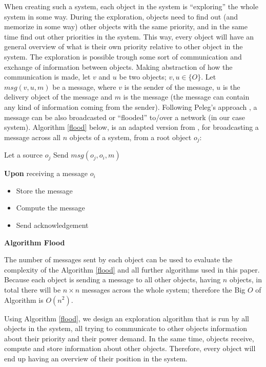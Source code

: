 \documentclass[../main/Self-Stabilization.tex]{subfiles}
\begin{document}
When creating such a system, each object in the system is ``exploring'' the whole system in some way. During the exploration, objects need to find out (and memorize in some way) other objects with the same priority, and in the same time find out other priorities in the system. This way, every object will have an general overview of what is their own priority relative to other object in the system. The exploration is possible trough some sort of communication and exchange of information between objects. Making abstraction of how the communication is made, let $v$ and $u$ be two objects; $v,u \in\{O\}$. Let $msg(v,u,m)$ be a message, where $v$ is the sender of the message, $u$ is the delivery object of the message and $m$ is the message (the message can contain any kind of information coming from the sender). Following Peleg's approach \cite{peleg2000distributed}, a message can be also broadcasted or ``flooded'' to/over a network (in our case system). Algorithm \ref{flood} below, is an adapted version from \cite{peleg2000distributed}, for broadcasting a message across all $n$ objects of a system, from a root object $o_{j}$:

\LinesNumbered
\IncMargin{1em}
\begin{algorithm}
Let a source $o_{j}$
\BlankLine
{} {
     {	
        Send \emph{$msg(o_{j},o_{i},m)$}
    }
}
 {
    \textbf{Upon} receiving a message $o_{i}$
    \begin{itemize}
      \item Store the message
      \item Compute the message
      \item Send acknowledgement
    \end{itemize}
}
\caption{\textbf{Algorithm Flood}} \label{flood}
\end{algorithm}
\DecMargin{1em}

The number of messages sent by each object can be used to evaluate the complexity of the Algorithm \ref{flood} and all further algorithms used in this paper. Because each object is sending a message to all other objects, having $n$ objects, in total there will be $n \times n$ messages across the whole system; therefore the Big $O$ of Algorithm is $O(n^2)$.

Using Algorithm \ref{flood}, we design an exploration algorithm that is run by all objects in the system, all trying to communicate to other objects information about their priority and their power demand. In the same time, objects receive, compute and store information about other objects. Therefore, every object will end up having an overview of their position in the system.
\end{document}
